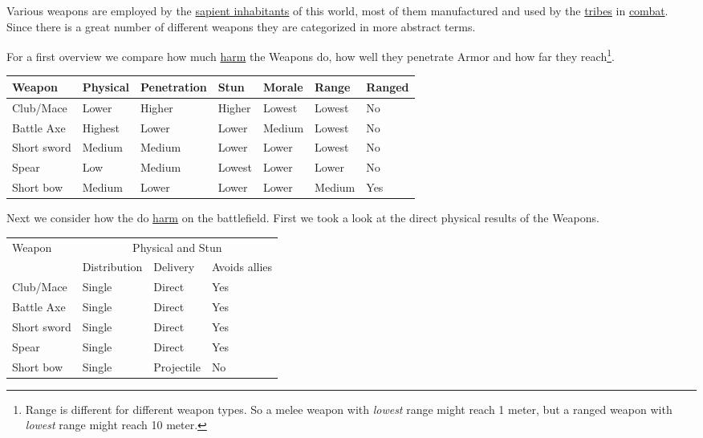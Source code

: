Various weapons are employed by the
\hyperref[ch:World:Inhabitants:Sapients]{sapient inhabitants} of this world,
most of them manufactured and used by the \hyperref[ch:Tribes]{tribes} in
\hyperref[ch:Conflict:Combat]{combat}. Since there is a great number of
different weapons they are categorized in more abstract terms.

For a first overview we compare how much \hyperref[ch:Conflict:Combat]{harm}
the \glspl{Weapon} do, how well they penetrate \gls{Armor} and how far they
reach\footnote{ Range is different for different weapon types. So a melee
	weapon with \emph{lowest} range might reach 1 meter, but a ranged weapon with
	\emph{lowest} range might reach 10 meter. }.

\begin{longtable}{lllllll}
	\toprule
	Weapon
	 & Physical & Penetration
	 & Stun     & Morale
	 & Range    & Ranged      \\
	\midrule
	Club/Mace
	 & Lower    & Higher
	 & Higher   & Lowest
	 & Lowest   & No          \\
	Battle Axe
	 & Highest  & Lower
	 & Lower    & Medium
	 & Lowest   & No          \\
	Short sword
	 & Medium   & Medium
	 & Lower    & Lower
	 & Lowest   & No          \\
	Spear
	 & Low      & Medium
	 & Lowest   & Lower
	 & Lower    & No          \\
	Short bow
	 & Medium   & Lower
	 & Lower    & Lower
	 & Medium   & Yes         \\
	\bottomrule
\end{longtable}

Next we consider how the do \hyperref[ch:Conflict:Combat]{harm} on the
battlefield. First we took a look at the direct physical results of the
\glspl{Weapon}.

\begin{longtable}{llll}
	\toprule
	Weapon
	 & \multicolumn{3}{c}{Physical and Stun}                              \\
	 & Distribution                          & Delivery   & Avoids allies \\
	\midrule
	Club/Mace
	 & Single                                & Direct     & Yes           \\
	Battle Axe
	 & Single                                & Direct     & Yes           \\
	Short sword
	 & Single                                & Direct     & Yes           \\
	Spear
	 & Single                                & Direct     & Yes           \\
	Short bow
	 & Single                                & Projectile & No            \\
	\bottomrule
\end{longtable}

